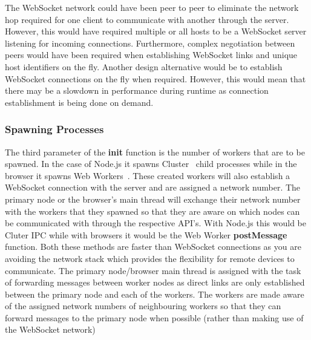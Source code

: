 \documentclass[12pt, a4paper]{report}
\theoremstyle{definition}
\theoremstyle{definition}%
\theoremstyle{definition}%
\theoremstyle{definition}%
\theoremstyle{definition}%
\theoremstyle{definition}%
\begin{document}
The WebSocket network could have been peer to peer to eliminate the network hop required for one client to communicate with another through the server. However, this would have required multiple or all hosts to be a WebSocket server listening for incoming connections. Furthermore, complex negotiation between peers would have been required when establishing WebSocket links and unique host identifiers on the fly. Another design alternative would be to establish WebSocket connections on the fly when required. However, this would mean that there may be a slowdown in performance during runtime as connection establishment is being done on demand.

\subsubsection{Spawning Processes}
The third parameter of the \textbf{init} function is the number of workers that are to be spawned. In the case of Node.js it spawns Cluster~\cite{cluster} child processes while in the browser it spawns Web Workers~\cite{webworkers}. These created workers will also establish a WebSocket connection with the server and are assigned a network number. The primary node or the browser's main thread will exchange their network number with the workers that they spawned so that they are aware on which nodes can be communicated with through the respective API's. With Node.js this would be Cluter IPC while with browsers it would be the Web Worker \textbf{postMessage} function. Both these methods are faster than WebSocket connections as you are avoiding the network stack which provides the flexibility for remote devices to communicate. The primary node/browser main thread is assigned with the task of forwarding messages between worker nodes as direct links are only established between the primary node and each of the workers. The workers are made aware of the assigned network numbers of neighbouring workers so that they can forward messages to the primary node when possible (rather than making use of the WebSocket network)
\end{document}
